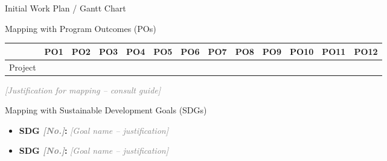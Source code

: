 \documentclass[aspectratio=169,11pt]{beamer}
\newcommand{\placeholder}[1]{\textcolor{gray}{\textit{[#1]}}}
\begin{document}
\begin{frame}{Initial Work Plan / Gantt Chart}
  \centering
\end{frame}

\begin{frame}{Mapping with Program Outcomes (POs)}
  \centering\small
  \begin{tabular}{@{}lcccccccccccc@{}}
    \toprule
    & PO1 & PO2 & PO3 & PO4 & PO5 & PO6 & PO7 & PO8 & PO9 & PO10 & PO11 & PO12 \\
    \midrule
    Project & & & & & & & & & & & & \\
    \bottomrule
  \end{tabular}

  \vspace{1em}
  \placeholder{Justification for mapping -- consult guide}
\end{frame}

\begin{frame}{Mapping with Sustainable Development Goals (SDGs)}
  \begin{itemize}
    \item \textbf{SDG \placeholder{No.}:} \placeholder{Goal name -- justification}
    \item \textbf{SDG \placeholder{No.}:} \placeholder{Goal name -- justification}
  \end{itemize}
\end{frame}

\end{document}
